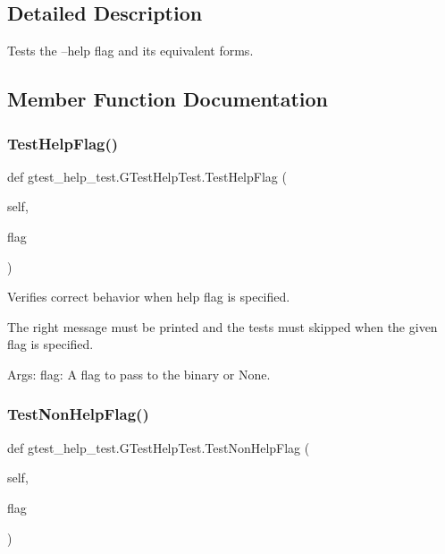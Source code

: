 \subsection{Detailed Description}
\begin{DoxyVerb}Tests the --help flag and its equivalent forms.\end{DoxyVerb}
 

\subsection{Member Function Documentation}
\mbox{\label{classgtest__help__test_1_1GTestHelpTest_a26cc1a64bd67278252ebfcd0ac0dca0c}} 
\subsubsection{\texorpdfstring{TestHelpFlag()}{TestHelpFlag()}}
{\footnotesize\ttfamily def gtest\+\_\+help\+\_\+test.\+G\+Test\+Help\+Test.\+Test\+Help\+Flag (\begin{DoxyParamCaption}\item[{}]{self,  }\item[{}]{flag }\end{DoxyParamCaption})}

\begin{DoxyVerb}Verifies correct behavior when help flag is specified.

The right message must be printed and the tests must
skipped when the given flag is specified.

Args:
  flag:  A flag to pass to the binary or None.
\end{DoxyVerb}
 \mbox{\label{classgtest__help__test_1_1GTestHelpTest_a03ffa91ecf6193ed2ed80b53933112ab}} 
\subsubsection{\texorpdfstring{TestNonHelpFlag()}{TestNonHelpFlag()}}
{\footnotesize\ttfamily def gtest\+\_\+help\+\_\+test.\+G\+Test\+Help\+Test.\+Test\+Non\+Help\+Flag (\begin{DoxyParamCaption}\item[{}]{self,  }\item[{}]{flag }\end{DoxyParamCaption})}

